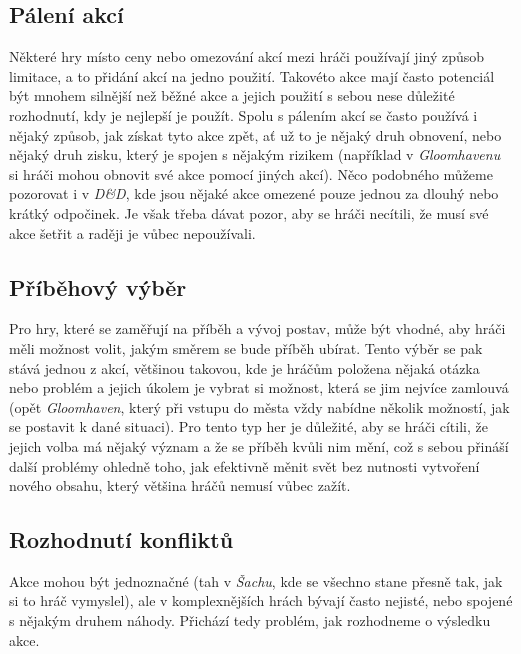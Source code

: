 \subsection{Pálení akcí}
\label{subsec:actions_burning_actions}

Některé hry místo ceny nebo omezování akcí mezi hráči používají jiný způsob limitace, a to přidání akcí na jedno použití. Takovéto akce mají často potenciál být mnohem silnější než běžné akce a jejich použití s sebou nese důležité rozhodnutí, kdy je nejlepší je použít. Spolu s pálením akcí se často používá i nějaký způsob, jak získat tyto akce zpět, ať už to je nějaký druh obnovení, nebo nějaký druh zisku, který je spojen s nějakým rizikem (například v \textit{Gloomhavenu} si hráči mohou obnovit své akce pomocí jiných akcí). Něco podobného můžeme pozorovat i v \textit{D\&D}, kde jsou nějaké akce omezené pouze jednou za dlouhý nebo krátký odpočinek. Je však třeba dávat pozor, aby se hráči necítili, že musí své akce šetřit a raději je vůbec nepoužívali.

\subsection{Příběhový výběr}
\label{subsec:actions_story_choice}

Pro hry, které se zaměřují na příběh a vývoj postav, může být vhodné, aby hráči měli možnost volit, jakým směrem se bude příběh ubírat. Tento výběr se pak stává jednou z akcí, většinou takovou, kde je hráčům položena nějaká otázka nebo problém a jejich úkolem je vybrat si možnost, která se jim nejvíce zamlouvá (opět \textit{Gloomhaven}, který při vstupu do města vždy nabídne několik možností, jak se postavit k dané situaci). Pro tento typ her je důležité, aby se hráči cítili, že jejich volba má nějaký význam a že se příběh kvůli nim mění, což s sebou přináší další problémy ohledně toho, jak efektivně měnit svět bez nutnosti vytvoření nového obsahu, který většina hráčů nemusí vůbec zažít.

\subsection{Rozhodnutí konfliktů}
\label{subsec:actions_action_resolution}

Akce mohou být jednoznačné (tah v \textit{Šachu}, kde se všechno stane přesně tak, jak si to hráč vymyslel), ale v komplexnějších hrách bývají často nejisté, nebo spojené s nějakým druhem náhody. Přichází tedy problém, jak rozhodneme o výsledku akce.

